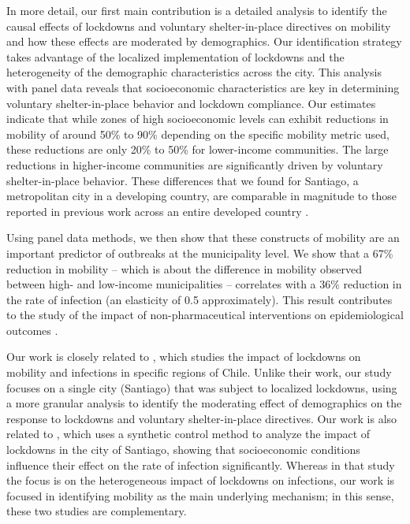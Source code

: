 In more detail, our first main contribution is a detailed analysis to identify the causal effects of lockdowns and voluntary shelter-in-place directives on mobility and how these effects are moderated by demographics. Our identification strategy takes advantage of the localized implementation of lockdowns and the heterogeneity of the demographic characteristics across the city. This analysis with panel data reveals that socioeconomic characteristics are key in determining voluntary shelter-in-place behavior and lockdown compliance.
Our estimates indicate that while zones of high socioeconomic levels can exhibit reductions in mobility of around 50\% to 90\% depending on the specific mobility metric used, these reductions are only 20\% to 50\% for lower-income communities. The large reductions in higher-income communities are significantly driven by voluntary shelter-in-place behavior.
These differences that we found for Santiago, a metropolitan city in a developing country, are comparable in magnitude to those reported in previous work across an entire developed country \citep{weill2020social}. 

Using panel data methods, we then show that these constructs of mobility are an important predictor of outbreaks at the municipality level. We show that a 67\% reduction in mobility -- which is about the difference in mobility observed between high- and low-income municipalities  -- correlates with a 36\% reduction in the rate of infection (an elasticity of 0.5 approximately).  This result contributes to the study of the impact of non-pharmaceutical interventions on epidemiological outcomes \citep{flaxman2020estimating,villas2020we,fang2020human,allcott2020economic}. 

Our work is closely related to \cite{cuadrado2020impact}, which studies the impact of lockdowns on mobility and infections in specific regions of Chile. Unlike their work, our study focuses on a single city (Santiago) that was subject to localized lockdowns, using a more granular analysis to identify the moderating effect of demographics on the response to lockdowns and voluntary shelter-in-place directives. Our work is also related to \cite{bennett2021all},  which uses a synthetic control method to analyze the impact of lockdowns in the city of Santiago, showing that socioeconomic conditions influence their effect on the rate of infection significantly. Whereas in that study the focus is on the heterogeneous impact of lockdowns on infections, our work is focused in identifying mobility as the main underlying mechanism;  in this sense, these two studies are complementary. 

